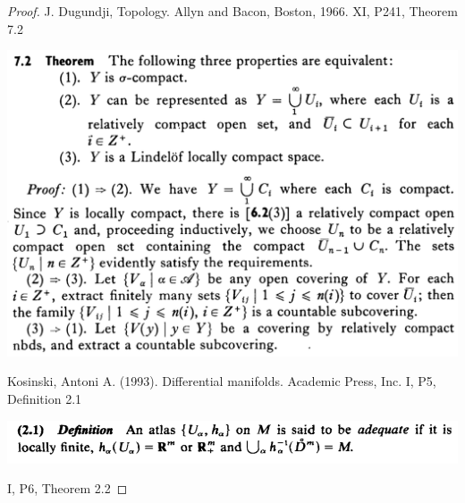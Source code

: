 \documentclass[12pt, letterpaper]{article}
\theoremstyle{definition}
\theoremstyle{remark}
\theoremstyle{definition}
\theoremstyle{plain}
\numberwithin{equation}{section}
\begin{document}
	\begin{proof}
		J. Dugundji, Topology. Allyn and Bacon, Boston, 1966.
		XI, P241, Theorem 7.2
		
		\includegraphics[scale=0.55]{sigma_compact}
		
		Kosinski, Antoni A. (1993). Differential manifolds. Academic Press, Inc. %
		I, P5, Definition 2.1
		
		\includegraphics[scale=0.65]{adequate_atlas_def}
		
		
		I, P6, Theorem 2.2
		

\end{proof}
\end{document}
